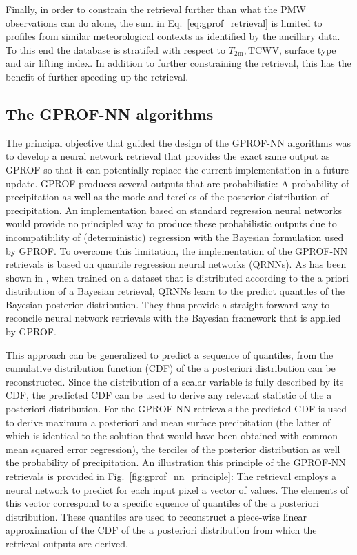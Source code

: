 \documentclass[a4paper,11pt,bibtotoc]{scrartcl}
\begin{document}
Finally, in order to constrain the retrieval further than what the PMW
observations can do alone, the sum in Eq.~\ref{eq:gprof_retrieval} is limited to
profiles from similar meteorological contexts as identified by the ancillary
data. To this end the database is stratifed with respect to $T_\text{2m},
\text{TCWV}$, surface type and air lifting index. In addition to further
constraining the retrieval, this has the benefit of further speeding up the
retrieval.

\subsection{The GPROF-NN algorithms}

The principal objective that guided the design of the GPROF-NN algorithms was to
develop a neural network retrieval that provides the exact same output as GPROF
so that it can potentially replace the current implementation in a future
update. GPROF produces several outputs that are probabilistic: A probability of
precipitation as well as the mode and terciles of the posterior distribution of
precipitation. An implementation based on standard regression neural networks
would provide no principled way to produce these probabilistic outputs due to
incompatibility of (deterministic) regression with the Bayesian formulation used
by GPROF. To overcome this limitation, the implementation of the GPROF-NN
retrievals is based on quantile regression neural networks (QRNNs). As has been
shown in \citep{pfreundschuh18}, when trained on a dataset that is distributed
according to the a priori distribution of a Bayesian retrieval, QRNNs learn to
the predict quantiles of the Bayesian posterior distribution. They thus provide
a straight forward way to reconcile neural network retrievals with the Bayesian
framework that is applied by GPROF.

This approach can be generalized to predict a sequence of quantiles, from the
cumulative distribution function (CDF) of the a posteriori distribution can be
reconstructed. Since the distribution of a scalar variable is fully described by
its CDF, the predicted CDF can be used to derive any relevant statistic of the a
posteriori distribution. For the GPROF-NN retrievals the predicted CDF is used
to derive maximum a posteriori and mean surface precipitation (the latter of
which is identical to the solution that would have been obtained with common
mean squared error regression), the terciles of the posterior distribution as
well the probability of precipitation. An illustration this principle of the
GPROF-NN retrievals is provided in Fig.~\ref{fig:gprof_nn_principle}: The
retrieval employs a neural network to predict for each input pixel a vector of
values. The elements of this vector correspond to a specific squence of
quantiles of the a posteriori distribution. These quantiles are used to
reconstruct a piece-wise linear approximation of the CDF of the a posteriori
distribution from which the retrieval outputs are derived.
\end{document}
